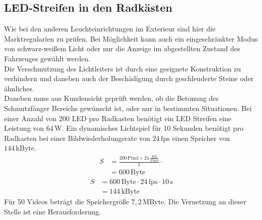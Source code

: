 \subsection{LED-Streifen in den Radkästen}
Wie bei den anderen Leuchteinrichtungen im Exterieur sind hier die Marktregularien zu prüfen. Bei Möglichkeit kann auch ein eingeschränkter Modus von schwarz-weißem Licht oder nur die Anzeige im abgestellten Zustand des Fahrzeuges gewählt werden. \\
Die Verschmutzung des Lichtleiters ist durch eine geeignete Konstruktion zu verhindern und daneben auch der Beschädigung durch geschleuderte Steine oder ähnliches. \\
Daneben muss aus Kundensicht geprüft werden, ob die Betonung des Schmutzfänger Bereichs gewünscht ist, oder nur in bestimmten Situationen.
Bei einer Anzahl von 200 LED pro Radkasten benötigt ein LED Streifen eine Leistung von $ 64\,\mathrm{W} $.
Ein dynamisches Lichtspiel für 10 Sekunden benötigt pro Radkasten bei einer Bildwiederholungsrate von $ 24\,\mathrm{fps} $ einen Speicher von $ 144\,\mathrm{kByte}$. \\
\begin{align}
	S &= \frac{200\,\mathrm{Pixel} \times 24\,\frac{\mathrm{Bit}}{\mathrm{Pixel}}}{1} \cdot \\
	&= 600\,\mathrm{Byte}
\end{align}
\begin{align}
	S &= 600\,\mathrm{Byte} \cdot 24\,\mathrm{fps} \cdot 10\,\mathrm{s}\\
	&= 144\,\mathrm{kByte}
\end{align}
Für 50 Videos beträgt die Speichergröße $ 7,2\,\mathrm{MByte} $.
Die Vernetzung an dieser Stelle ist eine Herausforderung.
